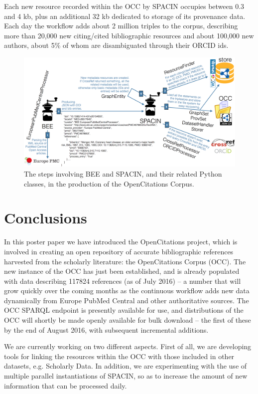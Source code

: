 \documentclass[runningheads,a4paper]{llncs}
\makeatletter
\def\maxwidth#1{\ifdim\Gin@nat@width>#1 #1\else\Gin@nat@width\fi}
\makeatother
\begin{document}
Each new resource recorded within the OCC by SPACIN occupies between 0.3 and 4 kb, plus an additional 32 kb dedicated to storage of its provenance data. Each day the workflow adds about 2 million triples to the corpus, describing more than 20,000 new citing/cited bibliographic resources and about 100,000 new authors, about 5\% of whom are disambiguated through their ORCID ids.
\begin{figure}[h!]
\centering
\includegraphics[width=\maxwidth{\textwidth}]{img/1000020100000948000004D0192123CB.png}
\cprotect\caption{The steps involving BEE and SPACIN, and their related Python classes, in the production of the OpenCitations Corpus.}
\label{refIllustration0}
\end{figure}


\section{Conclusions}

In this poster paper we have introduced the OpenCitations project, which is involved in creating an open repository of accurate bibliographic references harvested from the scholarly literature: the OpenCitations Corpus (OCC). The new instance of the OCC has just been established, and is already populated with data describing 117824 references (as of July 2016) -- a number that will grow quickly over the coming months as the continuous workflow adds new data dynamically from Europe PubMed Central and other authoritative sources. The OCC SPARQL endpoint is presently available for use, and distributions of the OCC will shortly be made openly available for bulk download -- the first of these by the end of August 2016, with subsequent incremental additions.

We are currently working on two different aspects. First of all, we are developing tools for linking the resources within the OCC with those included in other datasets, e.g. Scholarly Data. In addition, we are experimenting with the use of multiple parallel instantiations of SPACIN, so as to increase the amount of new information that can be processed daily. 
\end{document}
